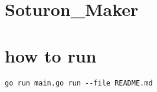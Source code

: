 \hypertarget{soturon_maker}{%
\section{Soturon\_Maker}\label{soturon_maker}}

\hypertarget{how-to-run}{%
\section{how to run}\label{how-to-run}}

\begin{verbatim}
go run main.go run --file README.md
\end{verbatim}
